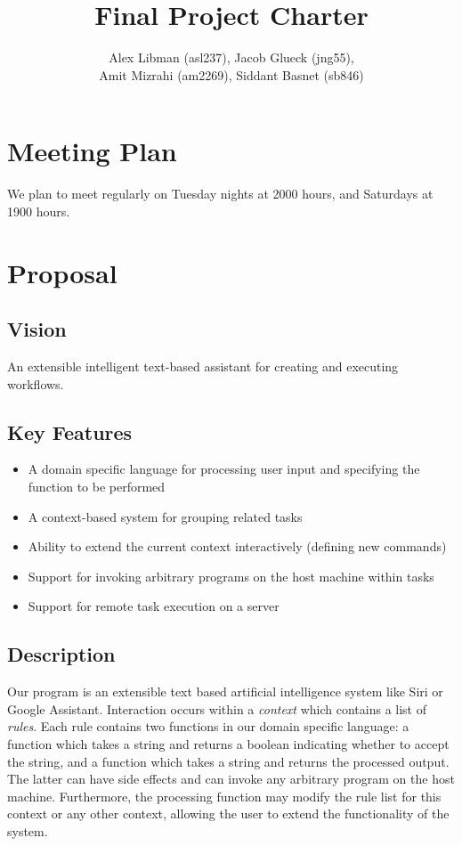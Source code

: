 \documentclass[a4paper]{article}
\title{Final Project Charter}
\author{Alex Libman (asl237), Jacob Glueck (jng55), \\Amit Mizrahi (am2269), Siddant Basnet (sb846)}
\date{}
\begin{document}
\maketitle

\section{Meeting Plan}
We plan to meet regularly on Tuesday nights at 2000 hours, and Saturdays at 1900 hours. 

\section{Proposal}
\subsection{Vision}
An extensible intelligent text-based assistant for creating and executing workflows.

\subsection{Key Features}
\begin{itemize}
	\item A domain specific language for processing user input and specifying the function to be performed
	\item A context-based system for grouping related tasks
	\item Ability to extend the current context interactively (defining new commands)
	\item Support for invoking arbitrary programs on the host machine within tasks
	\item Support for remote task execution on a server
\end{itemize}

\subsection{Description}
Our program is an extensible text based artificial intelligence system like Siri or Google Assistant. Interaction occurs within a \textit{context} which contains a list of \textit{rules}. Each rule contains two functions in our domain specific language: a function which takes a string and returns a boolean indicating whether to accept the string, and a function which takes a string and returns the processed output. The latter can have side effects and can invoke any arbitrary program on the host machine. Furthermore, the processing function may modify the rule list for this context or any other context, allowing the user to extend the functionality of the system.
\end{document}
